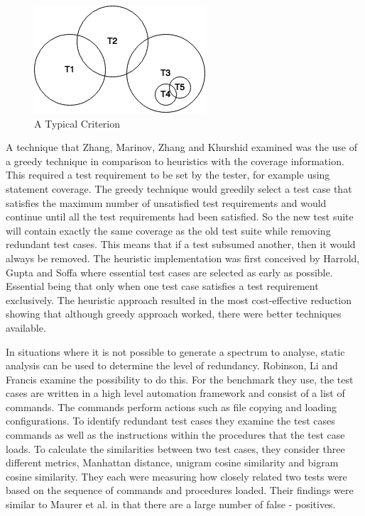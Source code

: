 \begin{figure}[h]
\begin{center}
\includegraphics[]{VennDiagram.png}
\end{center}
\caption{A Typical Criterion}
\label{fig:venndiagram}
\end{figure}

A technique that Zhang, Marinov, Zhang and Khurshid \cite{zhang2011empirical} examined was the use of a greedy technique in comparison to heuristics with the coverage information. This required a test requirement to be set by the tester, for example using statement coverage. The greedy technique would greedily select a test case that satisfies the maximum number of unsatisfied test requirements and would continue until all the test requirements had been satisfied. So the new test suite will contain exactly the same coverage as the old test suite while removing redundant test cases. This means that if a test subsumed another, then it would always be removed. The heuristic implementation was first conceived by Harrold, Gupta and Soffa \cite{harrold1993methodology} where essential test cases are selected as early as possible. Essential being that only when one test case satisfies a test requirement exclusively. The heuristic approach resulted in the most cost-effective reduction showing that although greedy approach worked, there were better techniques available.

In situations where it is not possible to generate a spectrum to analyse, static analysis can be used to determine the level of redundancy. Robinson, Li and Francis \cite{li2008static} examine the possibility to do this. For the benchmark they use, the test cases are written in a high level automation framework and consist of a list of commands. The commands perform actions such as file copying and loading configurations. To identify redundant test cases they examine the test cases commands as well as the instructions within the procedures that the test case loads. To calculate the similarities between two test cases, they consider three different metrics, Manhattan distance, unigram cosine similarity and bigram cosine similarity. They each were measuring how closely related two tests were based on the sequence of commands and procedures loaded. Their findings were similar to Maurer et al. \cite{koochakzadeh2009test} in that there are a large number of false - positives.

